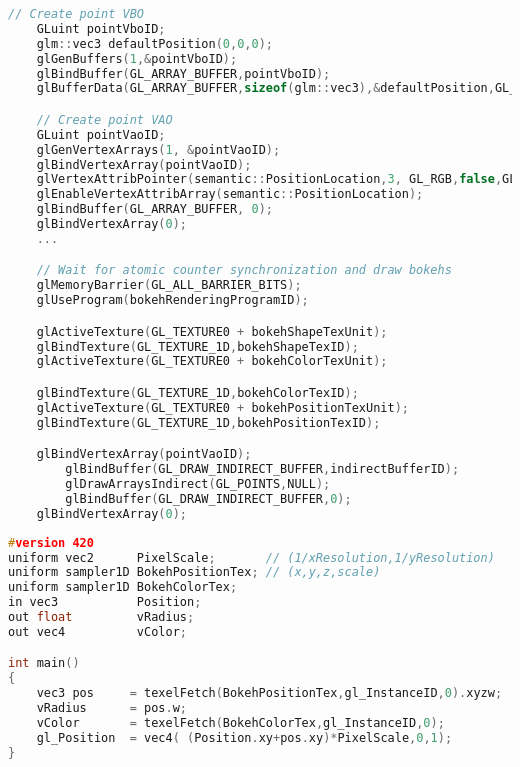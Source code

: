 \begin{lstlisting}[language=C++,float={htb},caption={Host application for rendering bokeh \emph{(Pass 4)}.},label={DeRousiers:renderingbokehcpp}]
	// Create point VBO
	GLuint pointVboID;
	glm::vec3 defaultPosition(0,0,0);
	glGenBuffers(1,&pointVboID);
	glBindBuffer(GL_ARRAY_BUFFER,pointVboID);
	glBufferData(GL_ARRAY_BUFFER,sizeof(glm::vec3),&defaultPosition,GL_STATIC_DRAW);

	// Create point VAO
	GLuint pointVaoID;
	glGenVertexArrays(1, &pointVaoID);
	glBindVertexArray(pointVaoID);
	glVertexAttribPointer(semantic::PositionLocation,3, GL_RGB,false,GL_FLOAT,GLF_BUFFER_OFFSET(_offset));
	glEnableVertexAttribArray(semantic::PositionLocation);
	glBindBuffer(GL_ARRAY_BUFFER, 0);
	glBindVertexArray(0);
	...

	// Wait for atomic counter synchronization and draw bokehs
	glMemoryBarrier(GL_ALL_BARRIER_BITS);
	glUseProgram(bokehRenderingProgramID);

	glActiveTexture(GL_TEXTURE0 + bokehShapeTexUnit);
	glBindTexture(GL_TEXTURE_1D,bokehShapeTexID);
	glActiveTexture(GL_TEXTURE0 + bokehColorTexUnit);

	glBindTexture(GL_TEXTURE_1D,bokehColorTexID);
	glActiveTexture(GL_TEXTURE0 + bokehPositionTexUnit);
	glBindTexture(GL_TEXTURE_1D,bokehPositionTexID);

	glBindVertexArray(pointVaoID);
		glBindBuffer(GL_DRAW_INDIRECT_BUFFER,indirectBufferID);
		glDrawArraysIndirect(GL_POINTS,NULL);
		glBindBuffer(GL_DRAW_INDIRECT_BUFFER,0);
	glBindVertexArray(0);
\end{lstlisting}


\begin{lstlisting}[language=C++,float={htb},caption={Pixel shader application for rendering bokeh \emph{(Pass 4)}.},label={DeRousiers:renderingbokehvs}]
#version 420
uniform vec2      PixelScale;       // (1/xResolution,1/yResolution)
uniform sampler1D BokehPositionTex; // (x,y,z,scale)
uniform sampler1D BokehColorTex;
in vec3           Position;
out float         vRadius;
out vec4          vColor;

int main()
{
	vec3 pos     = texelFetch(BokehPositionTex,gl_InstanceID,0).xyzw;
	vRadius      = pos.w;
	vColor       = texelFetch(BokehColorTex,gl_InstanceID,0);
	gl_Position	 = vec4( (Position.xy+pos.xy)*PixelScale,0,1);
}
\end{lstlisting}


